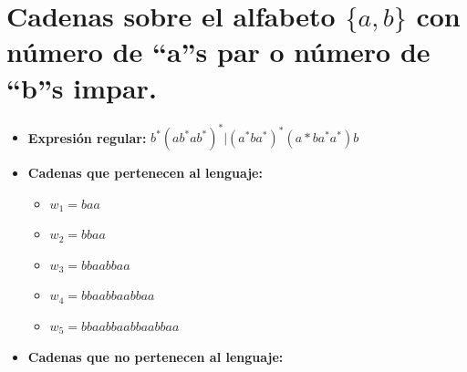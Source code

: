 \documentclass[11pt]{report}
\begin{document}
\section{Cadenas sobre el alfabeto \texorpdfstring{$\{a, b\}$}{\{a, b\}} con número de “a”s par o número de “b”s impar.}
\begin{itemize}
  \item \textbf{Expresión regular:} $b^*(ab^*ab^*)^*|(a^*ba^*)^*(a*ba^*a^*)b$
    \begin{figure}[H]
      \centering
    \end{figure}
  \item \textbf{Cadenas que pertenecen al lenguaje: }
    \begin{itemize}
      \item $w_1 = baa$
      \item $w_2 = bbaa$
      \item $w_3 = bbaabbaa$
      \item $w_4 = bbaabbaabbaa$
      \item $w_5 = bbaabbaabbaabbaa$
    \end{itemize}
  \item \textbf{Cadenas que no pertenecen al lenguaje: }

\end{itemize}

\newpage
\end{document}

